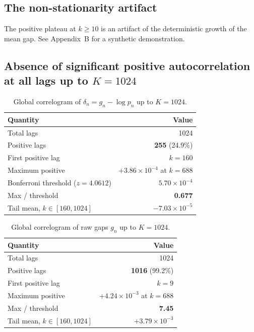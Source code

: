 \documentclass[11pt]{article}
\begin{document}
\subsection{The non-stationarity artifact}
The positive plateau at $k \ge 10$ is an artifact of the deterministic
growth of the mean gap. See Appendix~B for a synthetic demonstration.

\subsection{Absence of significant positive autocorrelation at all lags up to $K = 1024$}

\begin{table}[H]\centering
\caption{Global correlogram of $\delta_n = g_n - \log p_n$ up to
$K = 1024$.}
\label{tab:k1024delta}
\begin{tabular}{lr}
\toprule
Quantity & Value \\
\midrule
Total lags           & 1024 \\
Positive lags        & \textbf{255} (24.9\%) \\
First positive lag   & $k = 160$ \\
Maximum positive     & $+3.86 \times 10^{-4}$ at $k = 688$ \\
Bonferroni threshold ($z = 4.0612$) & $5.70 \times 10^{-4}$ \\
Max / threshold      & \textbf{0.677} \\
Tail mean, $k \in [160, 1024]$ & $-7.03 \times 10^{-5}$ \\
\bottomrule
\end{tabular}
\end{table}

\begin{table}[H]\centering
\caption{Global correlogram of raw gaps $g_n$ up to $K = 1024$.}
\label{tab:k1024raw}
\begin{tabular}{lr}
\toprule
Quantity & Value \\
\midrule
Total lags           & 1024 \\
Positive lags        & \textbf{1016} (99.2\%) \\
First positive lag   & $k = 9$ \\
Maximum positive     & $+4.24 \times 10^{-3}$ at $k = 688$ \\
Max / threshold      & \textbf{7.45} \\
Tail mean, $k \in [160, 1024]$ & $+3.79 \times 10^{-3}$ \\
\bottomrule
\end{tabular}
\end{table}
\end{document}
